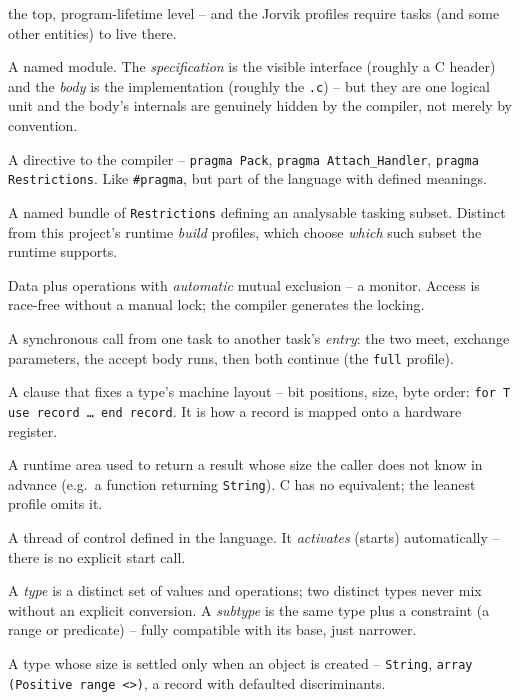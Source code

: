 \begin{description}[style=nextline]
  the top, program-lifetime level -- and the Jorvik profiles require tasks (and
  some other entities) to live there.
\item[Package (specification / body).] A named module. The \emph{specification}
  is the visible interface (roughly a C header) and the \emph{body} is the
  implementation (roughly the \texttt{.c}) -- but they are one logical unit and
  the body's internals are genuinely hidden by the compiler, not merely by
  convention.
\item[Pragma.] A directive to the compiler -- \texttt{pragma Pack},
  \texttt{pragma Attach\_Handler}, \texttt{pragma Restrictions}. Like
  \texttt{\#pragma}, but part of the language with defined meanings.
\item[Profile (Ravenscar / Jorvik).] A named bundle of \texttt{Restrictions}
  defining an analysable tasking subset. Distinct from this project's runtime
  \emph{build} profiles, which choose \emph{which} such subset the runtime
  supports.
\item[Protected object.] Data plus operations with \emph{automatic} mutual
  exclusion -- a monitor. Access is race-free without a manual lock; the compiler
  generates the locking.
\item[Rendezvous.] A synchronous call from one task to another task's
  \emph{entry}: the two meet, exchange parameters, the accept body runs, then both
  continue (the \texttt{full} profile).
\item[Representation clause.] A clause that fixes a type's machine layout -- bit
  positions, size, byte order: \texttt{for T use record \ldots\ end record}. It is
  how a record is mapped onto a hardware register.
\item[Secondary stack.] A runtime area used to return a result whose size the
  caller does not know in advance (e.g.\ a function returning \texttt{String}). C
  has no equivalent; the leanest profile omits it.
\item[Task.] A thread of control defined in the language. It \emph{activates}
  (starts) automatically -- there is no explicit start call.
\item[Type vs.\ subtype.] A \emph{type} is a distinct set of values and
  operations; two distinct types never mix without an explicit conversion. A
  \emph{subtype} is the same type plus a constraint (a range or predicate) --
  fully compatible with its base, just narrower.
\item[Unconstrained type.] A type whose size is settled only when an object is
  created -- \texttt{String}, \texttt{array (Positive range <>)}, a record with
  defaulted discriminants.
\end{description}

